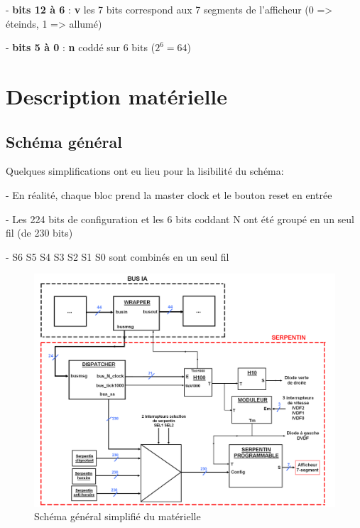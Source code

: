 \documentclass[10pt]{article}
\begin{document}
        - \textbf{bits 12 à 6} : \textbf{v} les 7 bits correspond aux 7 segments de l'afficheur (0 => éteinds, 1 => allumé)

        - \textbf{bits 5 à 0} : \textbf{n} coddé sur 6 bits ($2^6 = 64$)

    \newpage
    \section{Description matérielle}
    
        \subsection{Schéma général}

         Quelques simplifications ont eu lieu pour la lisibilité du schéma:
        
        - En réalité, chaque bloc prend la master clock et le bouton reset en entrée
        
        - Les 224 bits de configuration et les 6 bits coddant N ont été groupé en un seul fil (de 230 bits)
        
        - S6 S5 S4 S3 S2 S1 S0 sont combinés en un seul fil

        \begin{figure}[h!]
            \hspace*{-2cm}                                                          
            \includegraphics[width=20cm]{schema.png}
            \caption{Schéma général simplifié du matérielle}
        \end{figure}
\end{document}
